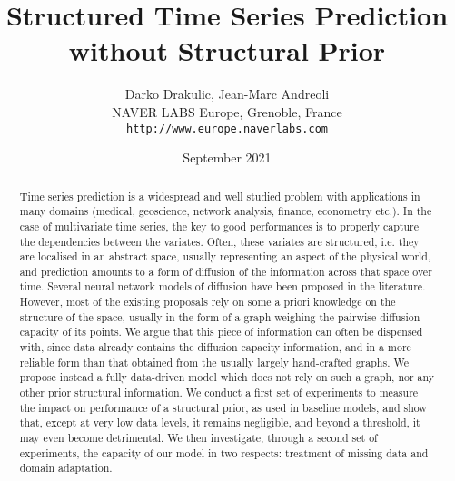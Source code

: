 \documentclass[a4paper]{article}
\title{Structured Time Series Prediction\\without Structural Prior}
\author{Darko Drakulic, Jean-Marc Andreoli\\NAVER LABS Europe, Grenoble, France\\
{\small\tt http://www.europe.naverlabs.com}}
\date{September 2021}
\begin{document}
\maketitle

\begin{abstract}
Time series prediction is a widespread and well studied problem with applications in many domains (medical, geoscience, network analysis, finance, econometry etc.). In the case of multivariate time series, the key to good performances is to properly capture the dependencies between the variates. Often, these variates are structured, i.e. they are localised in an abstract space, usually representing an aspect of the physical world, and prediction amounts to a form of diffusion of the information across that space over time. Several neural network models of diffusion have been proposed in the literature.
However, most of the existing proposals rely on some a priori knowledge on the structure of the space, usually in the form of a graph weighing the pairwise diffusion capacity of its points. We argue that this piece of information can often be dispensed with, since data already contains the diffusion capacity information, and in a more reliable form than that obtained from the usually largely hand-crafted graphs. We propose instead a fully data-driven model which does not rely on such a graph, nor any other prior structural information. We conduct a first set of experiments to measure the impact on performance of a structural prior, as used in baseline models, and show that, except at very low data levels, it remains negligible, and beyond a threshold, it may even become detrimental. We then investigate, through a second set of experiments, the capacity of our model in two respects: treatment of missing data and domain adaptation.
\end{abstract}
\end{document}
